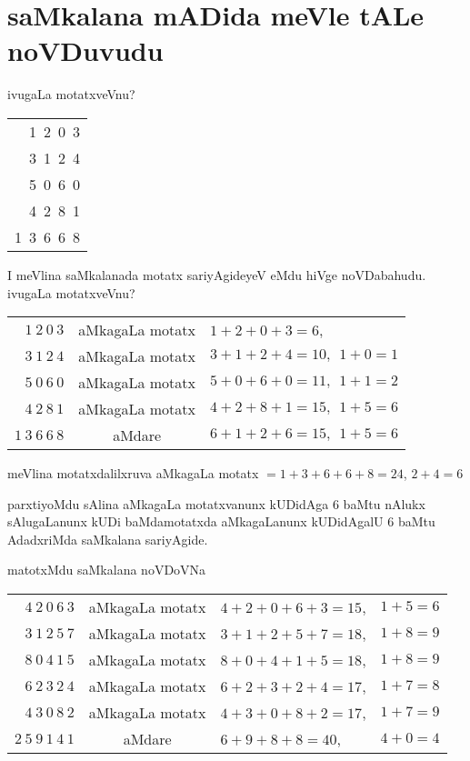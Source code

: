 \chapter{saMkalana mADida meVle tALe noVDuvudu}

ivugaLa motatxveVnu?

\begin{tabular}{r}
{\rm 1~2~0~3}\\
{\rm 3~1~2~4}\\
{\rm 5~0~6~0}\\
{\rm 4~2~8~1}\\\cline{1-1}
{\rm 1~3~6~6~8}
\end{tabular}

\smallskip

I meVlina saMkalanada motatx sariyAgideyeV eMdu hiVge noVDabahudu. ivugaLa motatxveVnu?

\smallskip

\begin{tabular}{rcl}
$1~ 2~ 0~  3$ & aMkagaLa motatx & $1+2+0+3=6$,\\
$3~1~2~4$ & aMkagaLa motatx & $3+1+2+4=10,~~ 1+0=1$\\
$5~0~6~0$ & aMkagaLa motatx & $5+0+6+0=11, ~~ 1+1=2$\\
$4~2~8~1$ & aMkagaLa motatx & $4+2+8+1=15, ~~ 1+5=6$\\\cline{1-1}
$1~3~6~6~8$ & aMdare & $6+1+2+6=15,~~ 1+5=6$ 
\end{tabular}

\smallskip

meVlina motatxdalilxruva aMkagaLa motatx $= 1+3+6+6+8=24$, $2+4=6$

parxtiyoMdu sAlina aMkagaLa motatxvanunx kUDidAga $6$ baMtu nAlukx sAlugaLanunx kUDi baMdamotatxda aMkagaLanunx kUDidAgalU $6$ baMtu AdadxriMda saMkalana sariyAgide.

\newpage

matotxMdu saMkalana noVDoVNa

\smallskip

\begin{tabular}{rcll}
$4~2~0~6~3$ & aMkagaLa motatx & $4+2+0+6+3=15$, & $1+5=6$\\ 
$3~1~2~5~7$ & aMkagaLa motatx & $3+1+2+5+7=18$, & $1+8=9$\\
$8~0~4~1~5$ & aMkagaLa motatx & $8+0+4+1+5=18$, & $1+8=9$\\
$6~2~3~2~4$ & aMkagaLa motatx & $6+2+3+2+4=17$, & $1+7=8$\\
$4~3~0~8~2$ & aMkagaLa motatx & $4+3+0+8+2=17$, & $1+7=9$\\\cline{1-1}\cline{4-4}
$2~5~9~1~4~1$ & aMdare & \qquad $6+9+8+8=40$, & $4+0=4$
\end{tabular}

